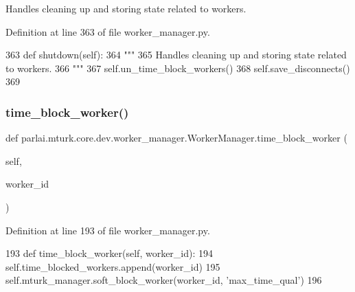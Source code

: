 \begin{DoxyVerb}Handles cleaning up and storing state related to workers.
\end{DoxyVerb}
 

Definition at line 363 of file worker\+\_\+manager.\+py.


\begin{DoxyCode}
363     \textcolor{keyword}{def }shutdown(self):
364         \textcolor{stringliteral}{"""}
365 \textcolor{stringliteral}{        Handles cleaning up and storing state related to workers.}
366 \textcolor{stringliteral}{        """}
367         self.un\_time\_block\_workers()
368         self.save\_disconnects()
369 \end{DoxyCode}
\mbox{\label{classparlai_1_1mturk_1_1core_1_1dev_1_1worker__manager_1_1WorkerManager_a030401bc408546feaed72b2dfedd148d}} 
\subsubsection{\texorpdfstring{time\+\_\+block\+\_\+worker()}{time\_block\_worker()}}
{\footnotesize\ttfamily def parlai.\+mturk.\+core.\+dev.\+worker\+\_\+manager.\+Worker\+Manager.\+time\+\_\+block\+\_\+worker (\begin{DoxyParamCaption}\item[{}]{self,  }\item[{}]{worker\+\_\+id }\end{DoxyParamCaption})}



Definition at line 193 of file worker\+\_\+manager.\+py.


\begin{DoxyCode}
193     \textcolor{keyword}{def }time\_block\_worker(self, worker\_id):
194         self.time\_blocked\_workers.append(worker\_id)
195         self.mturk\_manager.soft\_block\_worker(worker\_id, \textcolor{stringliteral}{'max\_time\_qual'})
196 
\end{DoxyCode}
\mbox{\label{classparlai_1_1mturk_1_1core_1_1dev_1_1worker__manager_1_1WorkerManager_a0cd13932ce8ffc3d6d794b4149ff5a42}} 
